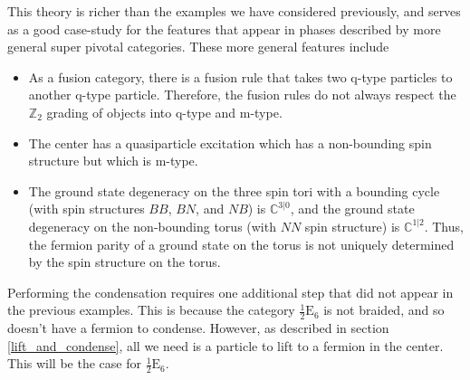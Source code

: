 \documentclass[12pt,a4paper]{article}
\newcommand{\zt}{\mathbb{Z}_2}
\newcommand{\dave}[1]{{\color{ao(english)}\footnotesize{(DA) #1}}}
\newcommand{\ethan}[1]{{\color{amethyst}\footnotesize{(EL) #1}}}
\newcommand{\kw}[1]{{\color{kwcolor}\footnotesize{(KW) #1}}}
\newcommand{\halfesix}{\frac{1}{2}\text{E}_6}
\begin{document}

This theory is richer than the examples we have considered previously, and serves as a good 
case-study for the features that appear in phases described by more general super pivotal 
categories. 
These more general features include 
\begin{itemize}
\item As a fusion category, there is a fusion rule that takes two q-type particles to another q-type particle. 
Therefore, the fusion rules do not always respect the $\zt$ grading of objects into q-type and m-type. 
\item The center has a quasiparticle excitation which has a non-bounding spin structure but which is m-type.
\item The ground state degeneracy on the three spin tori with a bounding cycle (with spin structures $BB$, $BN$, and $NB$) is $\mathbb{C}^{3|0}$, and the ground state degeneracy on the non-bounding torus (with $NN$ spin structure) is $\mathbb{C}^{1|2}$.
Thus, the fermion parity of a ground state on the torus is not uniquely determined by the spin structure on the torus.
\end{itemize}

Performing the condensation requires one additional step that did not appear in the previous examples. 
This is because the category $\halfesix$ is not braided, and so doesn't have a fermion to condense.
However, as described in section \ref{lift_and_condense}, all we need is a particle to lift to a fermion in the center. 
This will be the case for $\halfesix$.
\end{document}

